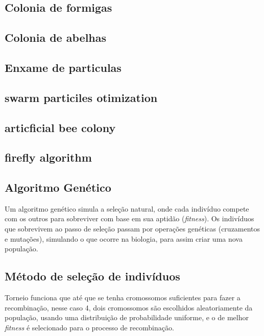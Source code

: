 \documentclass[12pt,a4paper]{article}
\begin{document}

\subsection{Colonia de formigas}

\subsection{Colonia de abelhas}

\subsection{Enxame de particulas}

\subsection{swarm particiles otimization}

\subsection{articficial bee colony}

\subsection{firefly algorithm}

\subsection{Algoritmo Genético}
\label{sec:alg_genetic}



Um algoritmo genético simula a seleção natural, onde cada indivíduo compete com os outros para sobreviver com base em sua aptidão (\emph{fitness}). Os indivíduos que sobrevivem ao passo de
seleção passam por operações genéticas (cruzamentos e mutações), simulando o que ocorre na biologia, para assim criar uma nova população.

    \subsection{Método de seleção de indivíduos}

        Torneio funciona que até que se tenha cromossomos suficientes para fazer a recombinação, nesse caso 4, dois cromossomos são escolhidos aleatoriamente da população, usando uma distribuição de
        probabilidade uniforme, e o de melhor \textit{fitness} é selecionado para o processo de recombinação.
\end{document}
